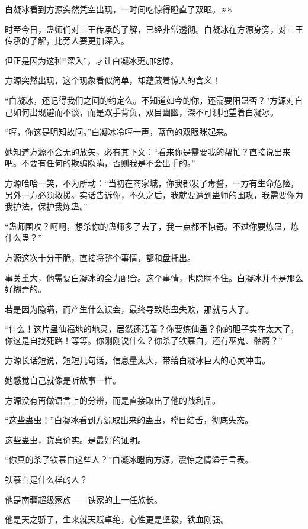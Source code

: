 
\begin{this_body}

白凝冰看到方源突然凭空出现，一时间吃惊得瞪直了双眼。※※

时至今日，蛊师们对三王传承的了解，已经非常透彻。白凝冰在方源身旁，对三王传承的了解，比旁人要更加深入。

但正是因为这种“深入”，才让白凝冰更加吃惊。

方源突然出现，这个现象看似简单，却蕴藏着惊人的含义！

“白凝冰，还记得我们之间的约定么。不知道如今的你，还需要阳蛊否？”方源对自己如何出现避而不谈，而是双手背负，双目幽幽，深不可测地望着白凝冰。

“哼，你这是明知故问。”白凝冰冷哼一声，蓝色的双眼眯起来。

她知道方源不会无的放矢，必有其下文：“看来你是需要我的帮忙？直接说出来吧。不要有任何的欺骗隐瞒，否则我是不会出手的。”

方源哈哈一笑，不为所动：“当初在商家城，你我都发了毒誓，一方有生命危险，另外一方必须救援。实话告诉你，不久之后，我就要遭到蛊师的围攻，我需要你为我护法，保护我炼蛊。”

“蛊师围攻？呵呵，想杀你的蛊师多了去了，我一点都不惊奇。不过你要炼蛊，炼什么蛊？”

方源这次十分干脆，直接将整个事情，都和盘托出。

事关重大，他需要白凝冰的全力配合。这个事情，也隐瞒不住。白凝冰并不是那么好糊弄的。

若是因为隐瞒，而产生什么误会，最终导致炼蛊失败，那就亏大了。

“什么！这片蛊仙福地的地灵，居然还活着？你要炼仙蛊？你的胆子实在太大了，你这是自找死路！等等。你刚刚说什么？你杀了铁慕白，还有巫鬼、骷魔？”

方源长话短说，短短几句话，信息量太大，带给白凝冰巨大的心灵冲击。

她感觉自己就像是听故事一样。

方源没有再做语言上的分辨，而是直接取出了他的战利品。

“这些蛊虫！”白凝冰看到方源取出来的蛊虫，瞠目结舌，彻底失态。

这些蛊虫，货真价实。是最好的证明。

“你真的杀了铁慕白这些人？”白凝冰瞪向方源，震惊之情溢于言表。

铁慕白是什么样的人？

他是南疆超级家族――铁家的上一任族长。

他是天之骄子，生来就天赋卓绝，心性更是坚毅，铁血刚强。


\end{this_body}
